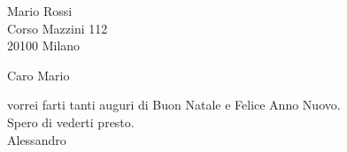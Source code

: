 \documentclass[12pt]{article}
\begin{document}
\hskip10cm
\parbox{5cm}{
  Mario  Rossi\\
   Corso Mazzini 112\\
   20100  Milano
  }
\vskip5cm

Caro Mario

vorrei farti tanti auguri di Buon Natale e Felice Anno Nuovo.\\
Spero di vederti presto.\\
\vskip1cm
Alessandro
\end{document}

